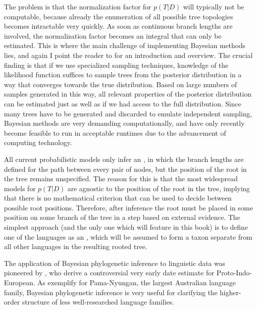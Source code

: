 \newpage 
The problem is that the normalization factor for $p(T|D)$ will typically not be computable, because already the enumeration of all possible tree topologies becomes intractable very quickly. As soon as continuous branch lengths are involved, the normalization factor becomes an integral that can only be estimated. This is where the main challenge of implementing Bayesian methods lies, and again I point the reader to \citet[Ch. 18]{felsenstein2004} for an introduction and overview. The crucial finding is that if we use specialized sampling techniques, knowledge of the likelihood function suffices to sample trees from the posterior distribution in a way that converges towards the true distribution. Based on large numbers of samples generated in this way, all relevant properties of the posterior distribution can be estimated just as well as if we had access to the full distribution. Since many trees have to be generated and discarded to emulate independent sampling, Bayesian methods are very demanding computationally, and have only recently become feasible to run in acceptable runtimes due to the advancement of computing technology.

All current probabilistic models only infer an \textit{}, in which the branch lengths are defined for the path between every pair of nodes, but the position of the root in the tree remains unspecified. The reason for this is that the most widespread models for $p(T|D)$ are agnostic to the position of the root in the tree, implying that there is no mathematical criterion that can be used to decide between possible root positions. Therefore, after inference the root must  be placed in some position on some branch of the tree in a \textit{} step based on external evidence. The simplest approach (and the only one which will feature in this book) is to define one of the languages as an \textit{}, which will be assumed to form a taxon separate from all other languages in the resulting rooted tree.

The application of Bayesian phylogenetic inference to linguistic data was pioneered by \citet{gray_atkinson_2003}, who derive a controversial very early date estimate for Proto-Indo-European. As \citet{bowern_atkinson_2012} exemplify for Pama-Nyungan, the largest Australian language family, Bayesian phylogenetic inference is very useful for clarifying the higher-order structure of less well-researched language families.

